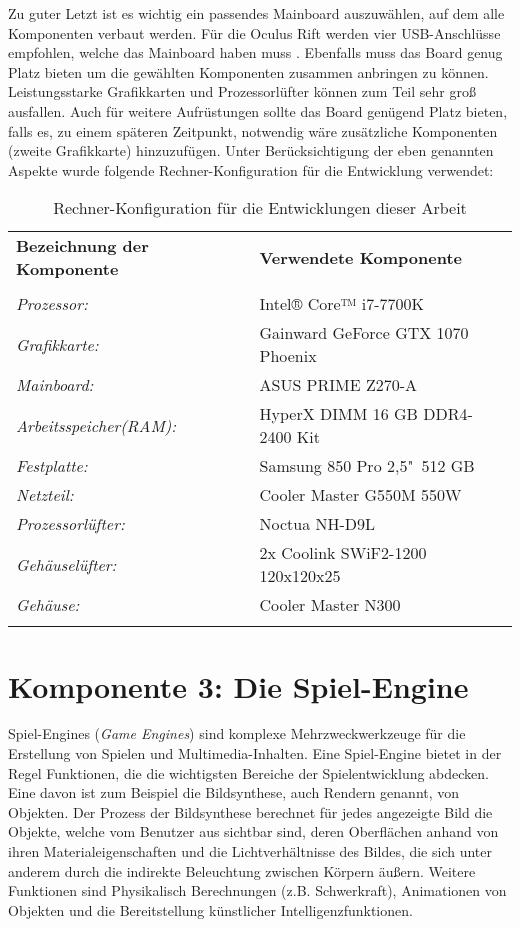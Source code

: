 Zu guter Letzt ist es wichtig ein passendes Mainboard auszuwählen, auf dem alle Komponenten verbaut werden. Für die Oculus Rift werden vier USB-Anschlüsse empfohlen, welche das Mainboard haben muss \cite{bib:OculusSpecs}. Ebenfalls muss das Board genug Platz bieten um die gewählten Komponenten zusammen anbringen zu können. Leistungsstarke Grafikkarten und Prozessorlüfter können zum Teil sehr groß ausfallen. Auch für weitere Aufrüstungen sollte das Board genügend Platz bieten, falls es, zu einem späteren Zeitpunkt, notwendig wäre zusätzliche Komponenten (zweite Grafikkarte) hinzuzufügen. Unter Berücksichtigung der eben genannten Aspekte wurde folgende Rechner-Konfiguration für die Entwicklung verwendet:\\  

\begin{table}[h]
 \begin{tabular}{ll}
  \textbf{Bezeichnung der Komponente} & \textbf{Verwendete Komponente}\\
  \\
  
  \textit{Prozessor:} & Intel® Core™ i7-7700K\\
  \textit{Grafikkarte:} & Gainward GeForce GTX 1070 Phoenix\\
  \textit{Mainboard:} & ASUS PRIME Z270-A\\
  \textit{Arbeitsspeicher(RAM):} & HyperX DIMM 16 GB DDR4-2400 Kit\\
  \textit{Festplatte:} & Samsung 850 Pro 2,5"\ 512 GB\\
  \textit{Netzteil:} & Cooler Master G550M 550W\\
  \textit{Prozessorlüfter:} & Noctua NH-D9L\\
  \textit{Gehäuselüfter:} & 2x Coolink SWiF2-1200 120x120x25\\
  \textit{Gehäuse:} & Cooler Master N300\\
\\
 \end{tabular}
 \caption{Rechner-Konfiguration für die Entwicklungen dieser Arbeit}
 \label{tab:Rechnerkonfig}
 \end{table}


\section{Komponente 3: Die Spiel-Engine}
\label{sec:VREngine}

Spiel-Engines (\textit{Game Engines}) sind komplexe Mehrzweckwerkzeuge für die Erstellung von Spielen und Multimedia-Inhalten. Eine Spiel-Engine bietet in der Regel Funktionen, die die wichtigsten Bereiche der Spielentwicklung abdecken. Eine davon ist zum Beispiel die Bildsynthese, auch Rendern genannt, von Objekten. Der Prozess der Bildsynthese berechnet für jedes angezeigte Bild die Objekte, welche vom Benutzer aus sichtbar sind, deren Oberflächen anhand von ihren Materialeigenschaften und die Lichtverhältnisse des Bildes, die sich unter anderem durch die indirekte Beleuchtung zwischen Körpern äußern. Weitere Funktionen sind Physikalisch Berechnungen (z.B. Schwerkraft), Animationen von Objekten und die Bereitstellung künstlicher Intelligenzfunktionen. 

